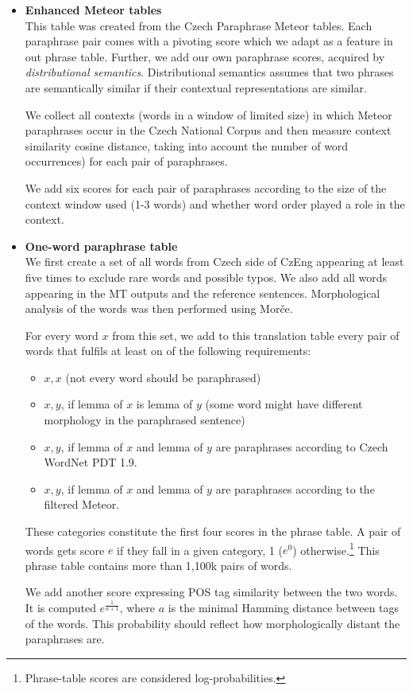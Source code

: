 \documentclass[11pt]{article}
\begin{document}
\begin{itemize}
\item \textbf{Enhanced Meteor tables}\\
This table was created from the Czech Paraphrase Meteor tables. Each paraphrase 
pair comes with a pivoting score which we adapt as a feature in out phrase 
table. Further, we add our own paraphrase scores, acquired by 
\textit{distributional semantics}. Distributional semantics assumes that two 
phrases are semantically similar if their contextual representations are 
similar. \cite{miller}

We collect all contexts (words in a window of limited size) in which Meteor 
paraphrases occur in the Czech National Corpus \cite{SYN2010} and then measure 
context similarity cosine distance, taking into account the number of word 
occurrences) for each pair of paraphrases. 

We add six scores for each pair of paraphrases according to the size of the 
context window used (1-3 words) and whether word order played a role in the 
context. 

\item\textbf{One-word paraphrase table}\\
We first create a set of all words from Czech side of CzEng appearing at 
least five times to exclude rare words and possible typos. We also add all 
words appearing in the MT outputs and the reference sentences. Morphological 
analysis of the words was then performed using Morče. 

For every word $ x $ from this set, we add to this translation table every pair 
of words that fulfils at least on of the following requirements:

\begin{itemize}
\item $ x,x $ (not every word should be paraphrased)
\item $ x,y $, if lemma of $ x $ is lemma of $ y $ (some word 
might have different morphology in the paraphrased sentence)
\item $ x,y $, if lemma of $ x $ and lemma of $ y $ are paraphrases according 
to Czech WordNet PDT 1.9.
\item $ x,y $, if lemma of $ x $ and lemma of $ y $ are paraphrases according 
to the filtered Meteor.
\end{itemize}

These categories constitute the first four scores in the phrase table. A pair 
of words gets score $ e $ if they fall in a given category, 1 ($e^0$) 
otherwise.\footnote{Phrase-table scores are considered log-probabilities.} 
This phrase table contains more than 1,100k pairs of words.

We add another score expressing POS tag similarity between the two words. It is 
computed $ e^{\frac{1}{a+1}}$, where $ a $ is the minimal Hamming distance 
between tags of the words. This probability should reflect how morphologically 
distant the paraphrases are. 
\end{itemize}
\end{document}
